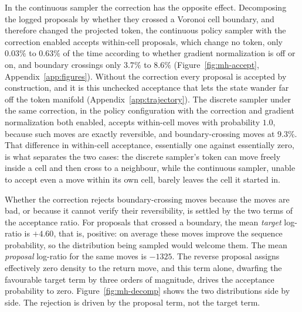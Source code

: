 In the continuous sampler the correction has the opposite effect. Decomposing the logged proposals by whether they crossed a Voronoi cell boundary, and therefore changed the projected token, the continuous policy sampler with the correction enabled accepts within-cell proposals, which change no token, only $0.03\%$ to $0.63\%$ of the time according to whether gradient normalization is off or on, and boundary crossings only $3.7\%$ to $8.6\%$ (Figure~\ref{fig:mh-accept}, Appendix~\ref{app:figures}). Without the correction every proposal is accepted by construction, and it is this unchecked acceptance that lets the state wander far off the token manifold (Appendix~\ref{app:trajectory}). %
The discrete sampler under the same correction, in the policy configuration with the correction and gradient normalization both enabled, accepts within-cell moves with probability $1.0$, because such moves are exactly reversible, and boundary-crossing moves at $9.3\%$. %
That difference in within-cell acceptance, essentially one against essentially zero, is what separates the two cases: the discrete sampler's token can move freely inside a cell and then cross to a neighbour, while the continuous sampler, unable to accept even a move within its own cell, barely leaves the cell it started in.

Whether the correction rejects boundary-crossing moves because the moves are bad, or because it cannot verify their reversibility, is settled by the two terms of the acceptance ratio. For proposals that crossed a boundary, the mean \emph{target} log-ratio is $+4.60$, that is, positive: on average these moves improve the sequence probability, so the distribution being sampled would welcome them. The mean \emph{proposal} log-ratio for the same moves is $-1325$.
The reverse proposal assigns effectively zero density to the return move, and this term alone, dwarfing the favourable target term by three orders of magnitude, drives the acceptance probability to zero. Figure~\ref{fig:mh-decomp} shows the two distributions side by side. The rejection is driven by the proposal term, not the target term.

